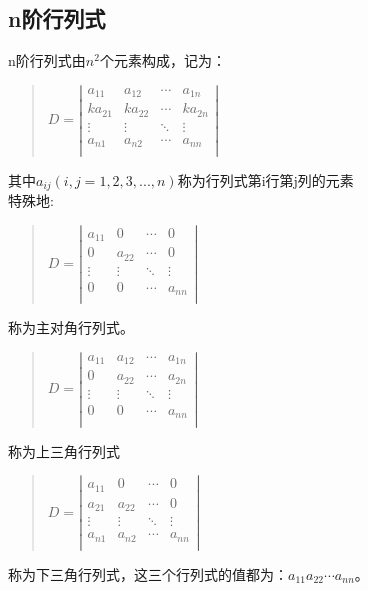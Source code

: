 \documentclass[a4paper,10pt]{article}
\begin{document}
\begin{CJK}{UTF8}{song}
\subsection{n阶行列式}
n阶行列式由$n^{2}$个元素构成，记为：
\begin{quote}
$D=\left|\begin{array}{cccc}
a_{11}&a_{12}&\cdots{}&a_{1n} \\
ka_{21}&ka_{22}&\cdots{}&ka_{2n} \\
\vdots&\vdots&\ddots{}&\vdots \\
a_{n1}&a_{n2}&\cdots{}&a_{nn} \\          
\end{array}\right| $
\end{quote}

其中$a_{ij}(i,j=1,2,3,...,n)$称为行列式第i行第j列的元素 \\
特殊地:
\begin{quote}
$D=\left|\begin{array}{cccc}
a_{11}&0&\cdots{}&0\\
0&a_{22}&\cdots{}&0 \\
\vdots&\vdots&\ddots{}&\vdots \\
0&0&\cdots{}&a_{nn} \\          
\end{array}\right| $
\end{quote}
称为主对角行列式。
\begin{quote}
$D=\left|\begin{array}{cccc}
a_{11}&a_{12}&\cdots{}&a_{1n} \\
0&a_{22}&\cdots{}&a_{2n} \\
\vdots&\vdots&\ddots{}&\vdots \\
0&0&\cdots{}&a_{nn} \\          
\end{array}\right| $
\end{quote}
称为上三角行列式
\begin{quote}
$D=\left|\begin{array}{cccc}
a_{11}&0&\cdots{}&0 \\
a_{21}&a_{22}&\cdots{}&0 \\
\vdots&\vdots&\ddots{}&\vdots \\
a_{n1}&a_{n2}&\cdots{}&a_{nn} \\          
\end{array}\right| $
\end{quote}
称为下三角行列式，这三个行列式的值都为：$a_{11}a_{22}\cdots{}a_{nn}$。


\end{CJK}
\end{document}
